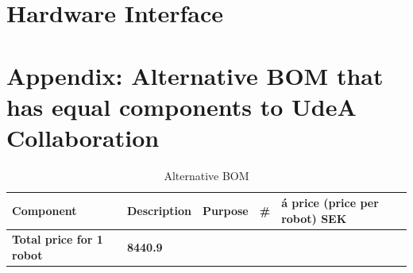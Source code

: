 \documentclass[a4paper,4pt]{article}
\begin{document}
  \section{Hardware Interface}

  \section{Appendix: Alternative BOM that has equal components to UdeA
    Collaboration}

  \begin{longtable}{|p{3cm}|p{3cm}|p{3cm}|p{1cm}|p{2cm}| }
    \caption{Alternative BOM}
    \label{tab:component_alt_bom}
    \\ \hline \rowcolor{gray!50} \textbf{Component} &
    \textbf{Description} & \textbf{Purpose} & \textbf{\#} & \textbf{á
      price (price per robot) SEK}\\ \endhead \hline

    \rowcolor{gray!50} \textbf{Total price for 1 robot} &
    \textbf{8440.9} \endlastfoot \hline


\end{longtable}
\end{document}
